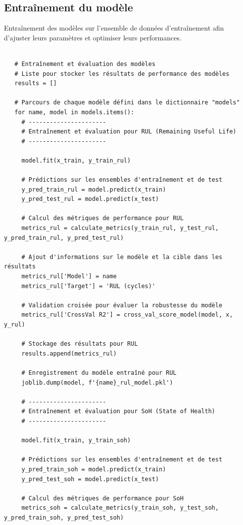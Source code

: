\subsection{Entraînement du modèle}
Entraînement des modèles sur l'ensemble de données d'entraînement afin d'ajuster leurs paramètres et optimiser leurs performances.
\begin{verbatim}

   # Entraînement et évaluation des modèles
   # Liste pour stocker les résultats de performance des modèles
   results = []
   
   # Parcours de chaque modèle défini dans le dictionnaire "models"
   for name, model in models.items():
     # ----------------------
     # Entraînement et évaluation pour RUL (Remaining Useful Life)
     # ----------------------
     
     model.fit(x_train, y_train_rul)
     
     # Prédictions sur les ensembles d'entraînement et de test
     y_pred_train_rul = model.predict(x_train)
     y_pred_test_rul = model.predict(x_test)
     
     # Calcul des métriques de performance pour RUL
     metrics_rul = calculate_metrics(y_train_rul, y_test_rul, y_pred_train_rul, y_pred_test_rul)
     
     # Ajout d'informations sur le modèle et la cible dans les résultats
     metrics_rul['Model'] = name
     metrics_rul['Target'] = 'RUL (cycles)'
     
     # Validation croisée pour évaluer la robustesse du modèle
     metrics_rul['CrossVal R2'] = cross_val_score_model(model, x, y_rul)
     
     # Stockage des résultats pour RUL
     results.append(metrics_rul)
     
     # Enregistrement du modèle entraîné pour RUL
     joblib.dump(model, f'{name}_rul_model.pkl')
   
     # ----------------------
     # Entraînement et évaluation pour SoH (State of Health)
     # ----------------------
     
	 model.fit(x_train, y_train_soh)
	    
     # Prédictions sur les ensembles d'entraînement et de test
     y_pred_train_soh = model.predict(x_train)
     y_pred_test_soh = model.predict(x_test)
     
     # Calcul des métriques de performance pour SoH
     metrics_soh = calculate_metrics(y_train_soh, y_test_soh, y_pred_train_soh, y_pred_test_soh)
     

\end{verbatim}
